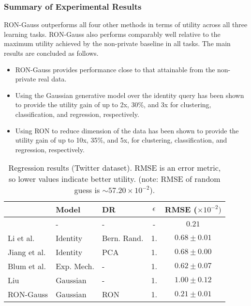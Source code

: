 \documentclass[USenglish,oneside,twocolumn]{article}
\providecommand{\tabularnewline}{\\}
\theoremstyle{definition}
\theoremstyle{remark}
\theoremstyle{plain}
\theoremstyle{plain}
\begin{document}
\vspace{-2em}
\subsubsection{Summary of Experimental Results}
\vspace{-1em}
RON-Gauss outperforms all four other methods in terms of
utility across all three learning tasks. RON-Gauss also performs comparably
well relative to the maximum utility achieved by the non-private baseline
in all tasks. The main results are concluded as follows. 
\begin{itemize}
\item RON-Gauss provides performance close to that attainable from the non-private
real data. 
\item Using the Gaussian generative model over the identity query has been
shown to provide the utility gain of up to 2x, 30\%, and 3x for clustering,
classification, and regression, respectively. 
\item Using RON to reduce dimension of the data has been shown to provide
the utility gain of up to 10x, 35\%, and 5x, for clustering, classification,
and regression, respectively. 
\end{itemize}


\vspace{-2em}

\begin{table}
\begin{centering}
\begin{tabular}{>{\centering}p{1.95cm}>{\centering}p{1.3cm}>{\centering}p{1cm}cc}
\toprule 
{Method }  & {Model }  & {DR} & {$\epsilon$}  & {RMSE ($\times10^{-2})$}\tabularnewline
\midrule
\midrule 
{Real data }  & {- }  & {- }  & {- }  & {$0.21$}\tabularnewline
\midrule 
{Li et al. \cite{RefWorks:337} }  & {Identity }  & {Bern. Rand. }  & {1. }  & {$0.68\pm0.01$}\tabularnewline
\midrule 
{Jiang et al. \cite{RefWorks:339} }  & {Identity }  & {PCA }  & {1. }  & {$0.68\pm0.00$}\tabularnewline
\midrule 
{Blum et al. \cite{RefWorks:174} }  & {Exp. Mech. }  & {- }  & {1. }  & {$0.62\pm0.07$}\tabularnewline
\midrule 
{Liu \cite{RefWorks:372} }  & {Gaussian}  & {- }  & {1.}  & {$1.00\pm0.12$}\tabularnewline
\midrule 
{RON-Gauss }  & {Gaussian}  & {RON} & {1. }  & {$0.21\pm0.01$}\tabularnewline
\bottomrule
\end{tabular}
\par\end{centering}
\caption{Regression results (Twitter dataset). RMSE is an error metric, so
lower values indicate better utility. (note: RMSE of random guess
is $\sim57.20\times10^{-2}$).\label{tab:Regression-results}}
\vspace{-1em}
\end{table}
\end{document}
